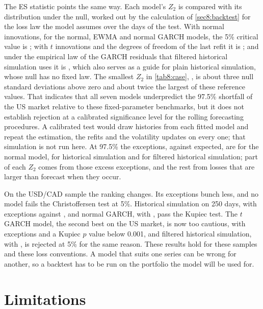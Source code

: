 \begin{chapterrefs}
The ES statistic points the same way. Each model's $Z_2$ is compared with its distribution under
the null, worked out by the calculation of \cref{sec8:backtest} for the loss law the model assumes over
the \caN{} days of the test. With normal innovations, for the normal, EWMA and normal GARCH models, the 5\% critical value is
\caCritNor; with $t$ innovations and the \caNuLast{} degrees of freedom of the last refit it is
\caCritT; and under the empirical law of the GARCH residuals that filtered historical simulation uses it
is \caCritEmp, which also serves as a guide for plain historical simulation, whose null has no fixed
law. The smallest $Z_2$ in \cref{tab8:case}, \caFhsEs, is about three null standard deviations above zero
and about twice the largest of these reference values. That indicates that all seven models
underpredict the 97.5\% shortfall of the US market relative to these fixed-parameter benchmarks, but
it does not establish rejection at a calibrated significance level for the rolling forecasting
procedures. A calibrated test would draw histories from each fitted model and repeat the
estimation, the refits and the volatility updates on every one; that simulation is not run here. At 97.5\% the exceptions, against
\caExpectedEs{} expected, are \caNorXs{} for the normal model, \caHsXs{} for historical simulation and
\caFhsXs{} for filtered historical simulation; part of each $Z_2$ comes from those excess exceptions,
and the rest from losses that are larger than forecast when they occur.

On the USD/CAD sample the ranking changes. Its exceptions bunch less, and no model fails the
Christoffersen test at 5\%. Historical simulation on 250 days, with \cyHsX{} exceptions against
\cyExpected, and normal GARCH, with \cyGnX, pass the Kupiec test. The $t$ GARCH model, the second best on
the US market, is now too cautious, with \cyGtX{} exceptions and a Kupiec $p$ value below 0.001, and
filtered historical simulation, with \cyFhsX, is rejected at 5\% for the same reason. These results hold for
these samples and these loss conventions. A model that suits one series can be wrong for another, so a
backtest has to be run on the portfolio the model will be used for.

\FloatBarrier
\section{Limitations}
\label{sec8:limits}


\end{chapterrefs}
